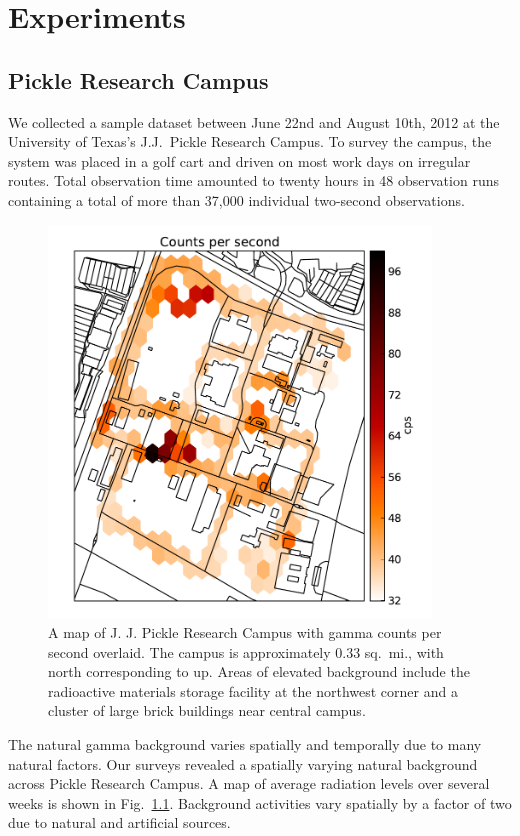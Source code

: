 \chapter{Experiments}

\section{Pickle Research Campus}\label{prcdata}

We collected a sample dataset between June 22nd and August 10th, 2012 at the
University of Texas's J.J.\ Pickle Research Campus.  To survey the campus, the
system was placed in a golf cart and driven on most work days on irregular
routes. Total observation time amounted to twenty hours in 48 observation runs
containing a total of more than 37,000 individual two-second observations.

\begin{figure}
  \centering
  \includegraphics[width=4in]{figures/prc-cps.pdf}
  \caption{A map of J. J. Pickle Research Campus with gamma counts per second
    overlaid.  The campus is approximately 0.33 sq.\ mi., with north
    corresponding to up.  Areas of elevated background include the radioactive
    materials storage facility at the northwest corner and a cluster of large
    brick buildings near central campus.}
  \label{prc-cps}
\end{figure}

The natural gamma background varies spatially and temporally due to many natural
factors.  Our surveys revealed a spatially varying natural background across
Pickle Research Campus. A map of average radiation levels over several weeks is
shown in Fig.\ \ref{prc-cps}. Background activities vary spatially by a factor
of two due to natural and artificial sources.

